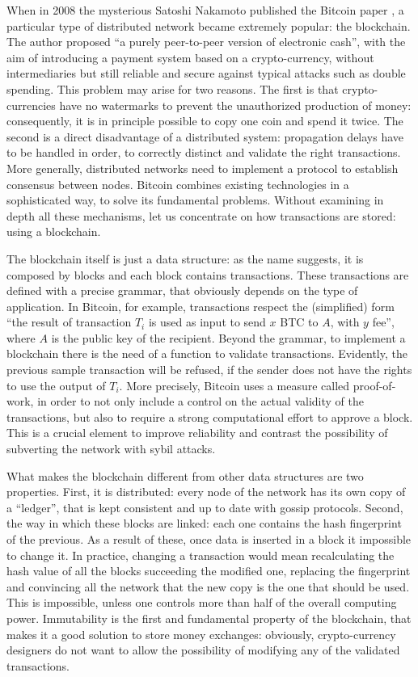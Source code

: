 When in 2008 the mysterious Satoshi Nakamoto published the Bitcoin paper \cite{bitcoin}, a particular type of distributed network became extremely popular: the blockchain. The author proposed ``a purely peer-to-peer version of electronic cash'', with the aim of introducing a payment system based on a crypto-currency, without intermediaries but still reliable and secure against typical attacks such as double spending. This problem may arise for two reasons. The first is that crypto-currencies have no watermarks to prevent the unauthorized production of money: consequently, it is in principle possible to copy one coin and spend it twice. The second is a direct disadvantage of a distributed system: propagation delays have to be handled in order, to correctly distinct and validate the right transactions. More generally, distributed networks need to implement a protocol to establish consensus between nodes.
Bitcoin combines existing technologies in a sophisticated way, to solve its fundamental problems. Without examining in depth all these mechanisms, let us concentrate on how transactions are stored: using a blockchain.

The blockchain itself is just a data structure: as the name suggests, it is composed by blocks and each block contains transactions. These transactions are defined with a precise grammar, that obviously depends on the type of application. In Bitcoin, for example, transactions respect the (simplified) form ``the result of transaction $T_i$ is used as input to send $x$ BTC to $A$, with $y$ fee'', where $A$ is the public key of the recipient. Beyond the grammar, to implement a blockchain there is the need of a function to validate transactions. Evidently, the previous sample transaction will be refused, if the sender does not have the rights to use the output of $T_i$. More precisely, Bitcoin uses a measure called proof-of-work, in order to not only include a control on the actual validity of the transactions, but also to require a strong computational effort to approve a block. This is a crucial element to improve reliability and contrast the possibility of subverting the network with sybil attacks. 

What makes the blockchain different from other data structures are two properties. First, it is distributed: every node of the network has its own copy of a ``ledger'', that is kept consistent and up to date with gossip protocols. Second, the way in which these blocks are linked: each one contains the hash fingerprint of the previous. As a result of these, once data is inserted in a block it impossible to change it. In practice, changing a transaction would mean recalculating the hash value of all the blocks succeeding the modified one, replacing the fingerprint and convincing all the network that the new copy is the one that should be used. This is impossible, unless one controls more than half of the overall computing power. Immutability is the first and fundamental property of the blockchain, that makes it a good solution to store money exchanges: obviously, crypto-currency designers do not want to allow the possibility of modifying any of the validated transactions.


